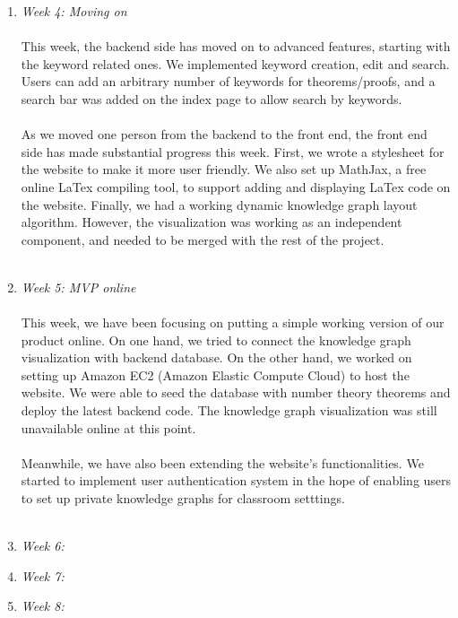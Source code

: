 \documentclass{acm_proc_article-sp}
\begin{document}
\begin{enumerate}
\item \emph{Week 4: Moving on}\\\\
This week, the backend side has moved on to advanced features, starting with the keyword related ones. We implemented keyword creation, edit and search. Users can add an arbitrary number of keywords for theorems/proofs, and a search bar was added on the index page to allow search by keywords.\\\\
As we moved one person from the backend to the front end, the front end side has made substantial progress this week. First, we wrote a stylesheet for the website to make it more user friendly. We also set up MathJax, a free online LaTex compiling tool, to support adding and displaying LaTex code on the website. Finally, we had a working dynamic knowledge graph layout algorithm. However, the visualization was working as an independent component, and needed to be merged with the rest of the project.\\\\


\item \emph{Week 5:  MVP online}\\\\
This week, we have been focusing on putting a simple working version of our product online. On one hand, we tried to connect the knowledge graph visualization with backend database. On the other hand, we worked on setting up Amazon EC2 (Amazon Elastic Compute Cloud) to host the website. We were able to seed the database with number theory theorems and deploy the latest backend code. The knowledge graph visualization was still unavailable online at this point. \\\\
Meanwhile, we have also been extending the website's functionalities. We started to implement user authentication system in the hope of enabling users to set up private knowledge graphs for classroom setttings.\\\\


\item \emph{Week 6: }\\



\item \emph{Week 7:  }\\

\item \emph{Week 8: }\\

\end{enumerate}
\end{document}
